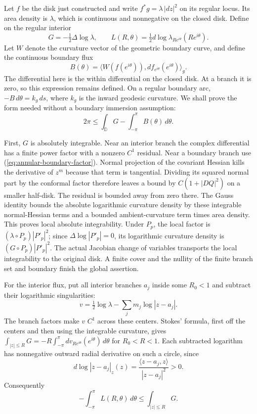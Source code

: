 \begin{lemma}\label{lem:annular-branched-gauss}
Let $f$ be the disk just constructed and write
$f^*g=\lambda\,|dz|^2$ on its regular locus.  Its area density is
$\lambda$, which is continuous and nonnegative on the closed disk.
Define on the regular interior
\[
 G=-\tfrac12\Delta\log\lambda,
 \qquad L(R,\theta)=\tfrac12
       d\log\lambda_{Re^{i\theta}}(Re^{i\theta}).
\]
Let $W$ denote the curvature vector of the geometric boundary curve,
and define the continuous boundary flux
\[
 B(\theta)=\big\langle W(f(e^{i\theta})),
                   df_{e^{i\theta}}(e^{i\theta})\big\rangle_g.
\]
The differential here is the within differential on the closed
disk.  At a branch it is zero, so this expression remains defined.
On a regular boundary arc, $-B\,d\theta=k_g\,ds$, where $k_g$ is
the inward geodesic curvature.  We shall prove the form needed
without a boundary immersion assumption:
\begin{equation}
 2\pi\le\int_{\mathbb D}G-\int_{-\pi}^{\pi}B(\theta)\,d\theta.
 \label{eq:annular-branched-gauss}
\end{equation}
\end{lemma}

First, $G$ is absolutely integrable.  Near an interior branch the
complex differential has a finite power factor with a nonzero
$C^1$ residual.  Near a boundary branch use
(\ref{eq:annular-boundary-factor}).  Normal projection of the
covariant Hessian kills the derivative of $z^m$ because that term
is tangential.  Dividing its squared normal part by the conformal
factor therefore leaves a bound by
$C(1+|DQ|^2)$ on a smaller half-disk.  The residual is bounded
away from zero there.  The Gauss identity bounds the absolute
logarithmic curvature density by these integrable normal-Hessian
terms and a bounded ambient-curvature term times area density.
This proves local absolute integrability.  Under $P_p$, the local
factor is $(\lambda\circ P_p)|P'_p|^2$; since
$\Delta\log|P'_p|=0$, its logarithmic curvature density is
$(G\circ P_p)|P'_p|^2$.  The actual Jacobian change of variables
transports the local integrability to the original disk.  A finite
cover and the nullity of the finite branch set and boundary finish
the global assertion.

For the interior flux, put all interior branches $a_j$ inside some
$R_0<1$ and subtract their logarithmic singularities:
\[
 v=\tfrac12\log\lambda-\sum_jm_j\log|z-a_j|.
\]
The branch factors make $v$ $C^1$ across these centers.  Stokes'
formula, first off the centers and then using the integrable
curvature, gives
$\int_{|z|\le R}G=-R\int_{-\pi}^{\pi}dv_{Re^{i\theta}}(e^{i\theta})\,d\theta$
for $R_0<R<1$.  Each subtracted logarithm has nonnegative outward
radial derivative on such a circle, since
\[
 d\log|z-a_j|_z(z)=\frac{\langle z-a_j,z\rangle}{|z-a_j|^2}>0.
\]
Consequently
\begin{equation}
 -\int_{-\pi}^{\pi}L(R,\theta)\,d\theta
                 \le\int_{|z|\le R}G.
 \label{eq:annular-interior-flux}
\end{equation}

